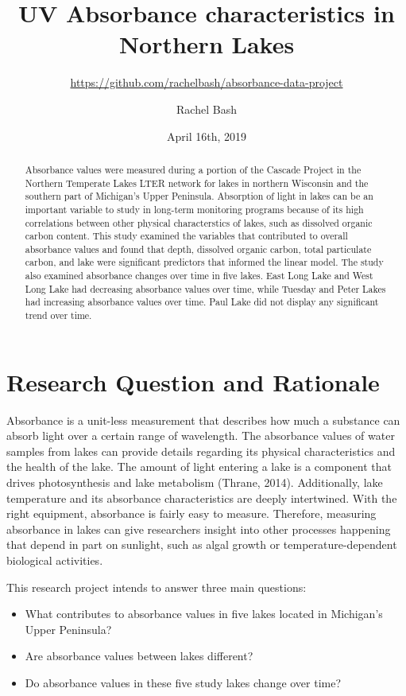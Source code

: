 \documentclass[12pt,]{article}
\title{UV Absorbance characteristics in Northern Lakes}
\subtitle{\url{https://github.com/rachelbash/absorbance-data-project}}
\author{Rachel Bash}
\date{April 16th, 2019}
\providecommand{\tightlist}{%
  \setlength{\itemsep}{0pt}\setlength{\parskip}{0pt}}
\begin{document}
\maketitle
\begin{abstract}
Absorbance values were measured during a portion of the Cascade Project
in the Northern Temperate Lakes LTER network for lakes in northern
Wisconsin and the southern part of Michigan's Upper Peninsula.
Absorption of light in lakes can be an important variable to study in
long-term monitoring programs because of its high correlations between
other physical characterstics of lakes, such as dissolved organic carbon
content. This study examined the variables that contributed to overall
absorbance values and found that depth, dissolved organic carbon, total
particulate carbon, and lake were significant predictors that informed
the linear model. The study also examined absorbance changes over time
in five lakes. East Long Lake and West Long Lake had decreasing
absorbance values over time, while Tuesday and Peter Lakes had
increasing absorbance values over time. Paul Lake did not display any
significant trend over time.
\end{abstract}

\newpage

\tableofcontents  \newpage
\listoftables
\newpage
\listoffigures  \newpage

\section{Research Question and
Rationale}\label{research-question-and-rationale}

Absorbance is a unit-less measurement that describes how much a
substance can absorb light over a certain range of wavelength. The
absorbance values of water samples from lakes can provide details
regarding its physical characteristics and the health of the lake. The
amount of light entering a lake is a component that drives
photosynthesis and lake metabolism (Thrane, 2014). Additionally, lake
temperature and its absorbance characteristics are deeply intertwined.
With the right equipment, absorbance is fairly easy to measure.
Therefore, measuring absorbance in lakes can give researchers insight
into other processes happening that depend in part on sunlight, such as
algal growth or temperature-dependent biological activities.

This research project intends to answer three main questions:

\begin{itemize}
\tightlist
\item
  What contributes to absorbance values in five lakes located in
  Michigan's Upper Peninsula?
\item
  Are absorbance values between lakes different?
\item
  Do absorbance values in these five study lakes change over time?
\end{itemize}
\end{document}
